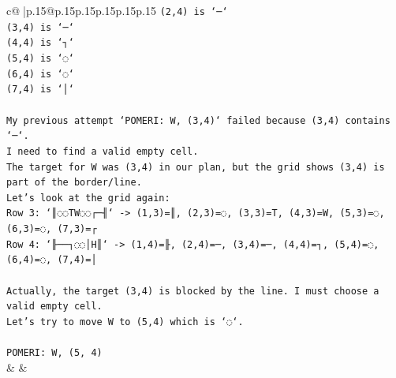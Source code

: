 \documentclass{article}
\begin{document}
{\begin{supertabular}{c@{$\;$}|p{.15\linewidth}@{}p{.15\linewidth}p{.15\linewidth}p{.15\linewidth}p{.15\linewidth}p{.15\linewidth}}
{{{\texttt{(2,4) is `─`} \\
\texttt{(3,4) is `─`} \\
\texttt{(4,4) is `┐`} \\
\texttt{(5,4) is `◌`} \\
\texttt{(6,4) is `◌`} \\
\texttt{(7,4) is `│`} \\
\\ 
\texttt{My previous attempt `POMERI: W, (3,4)` failed because (3,4) contains `─`.} \\
\texttt{I need to find a valid empty cell.} \\
\texttt{The target for W was (3,4) in our plan, but the grid shows (3,4) is part of the border/line.} \\
\texttt{Let's look at the grid again:} \\
\texttt{Row 3: `║◌◌TW◌◌┌─╢` {-}> (1,3)=║, (2,3)=◌, (3,3)=T, (4,3)=W, (5,3)=◌, (6,3)=◌, (7,3)=┌} \\
\texttt{Row 4: `╟──┐◌◌│H║` {-}> (1,4)=╟, (2,4)=─, (3,4)=─, (4,4)=┐, (5,4)=◌, (6,4)=◌, (7,4)=│} \\
\\ 
\texttt{Actually, the target (3,4) is blocked by the line. I must choose a valid empty cell.} \\
\texttt{Let's try to move W to (5,4) which is `◌`.} \\
\\ 
\texttt{POMERI: W, (5, 4)} \\
            }
        }
    }
    & & \\ \\


\end{supertabular}}
\end{document}
